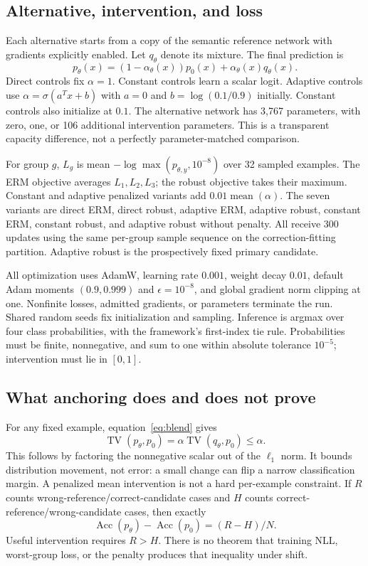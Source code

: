 \subsection{Alternative, intervention, and loss}
Each alternative starts from a copy of the semantic reference network with
gradients explicitly enabled. Let $q_\theta$ denote its mixture. The final
prediction is
\begin{equation}\label{eq:blend}
 p_\theta(x)=(1-\alpha_\theta(x))p_0(x)+\alpha_\theta(x)q_\theta(x).
\end{equation}
Direct controls fix $\alpha=1$. Constant controls learn a scalar logit.
Adaptive controls use $\alpha=\sigma(a^Tx+b)$ with $a=0$ and
$b=\log(0.1/0.9)$ initially. Constant controls also initialize at $0.1$.
The alternative network has 3,767 parameters, with zero, one, or 106 additional
intervention parameters. This is a transparent capacity difference, not a
perfectly parameter-matched comparison.

For group $g$, $L_g$ is mean $-\log\max(p_{\theta,y},10^{-8})$ over 32 sampled
examples. The ERM objective averages $L_1,L_2,L_3$; the robust objective takes
their maximum. Constant and adaptive penalized variants add
$0.01\operatorname{mean}(\alpha)$. The seven variants are direct ERM, direct
robust, adaptive ERM, adaptive robust, constant ERM, constant robust, and
adaptive robust without penalty. All receive 300 updates using the same
per-group sample sequence on the correction-fitting partition. Adaptive robust
is the prospectively fixed primary candidate.

All optimization uses AdamW, learning rate $0.001$, weight decay $0.01$, default
Adam moments $(0.9,0.999)$ and $\epsilon=10^{-8}$, and global gradient norm
clipping at one. Nonfinite losses, admitted gradients, or parameters terminate
the run. Shared random seeds fix initialization and sampling. Inference is
argmax over four class probabilities, with the framework's first-index tie
rule. Probabilities must be finite, nonnegative, and sum to one within absolute
tolerance $10^{-5}$; intervention must lie in $[0,1]$.

\subsection{What anchoring does and does not prove}
For any fixed example, equation~\eqref{eq:blend} gives
\begin{equation}
 \operatorname{TV}(p_\theta,p_0)=\alpha\operatorname{TV}(q_\theta,p_0)\leq\alpha.
\end{equation}
This follows by factoring the nonnegative scalar out of the $\ell_1$ norm.
It bounds distribution movement, not error: a small change can flip a narrow
classification margin. A penalized mean intervention is not a hard per-example
constraint. If $R$ counts wrong-reference/correct-candidate cases and $H$ counts
correct-reference/wrong-candidate cases, then exactly
\begin{equation}\label{eq:rescue}
 \operatorname{Acc}(p_\theta)-\operatorname{Acc}(p_0)=(R-H)/N.
\end{equation}
Useful intervention requires $R>H$. There is no theorem that training NLL,
worst-group loss, or the penalty produces that inequality under shift.

